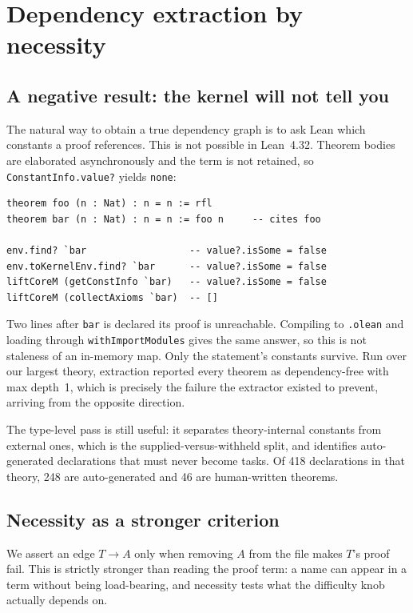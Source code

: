 \documentclass[10pt]{article}
\begin{document}
\section{Dependency extraction by necessity}
\label{sec:extract}

\subsection{A negative result: the kernel will not tell you}

The natural way to obtain a true dependency graph is to ask Lean which constants
a proof references. This is not possible in Lean~4.32. Theorem bodies are
elaborated asynchronously and the term is not retained, so
\texttt{ConstantInfo.value?} yields \texttt{none}:

\begin{lstlisting}
theorem foo (n : Nat) : n = n := rfl
theorem bar (n : Nat) : n = n := foo n     -- cites foo

env.find? `bar                  -- value?.isSome = false
env.toKernelEnv.find? `bar      -- value?.isSome = false
liftCoreM (getConstInfo `bar)   -- value?.isSome = false
liftCoreM (collectAxioms `bar)  -- []
\end{lstlisting}

Two lines after \texttt{bar} is declared its proof is unreachable. Compiling to
\texttt{.olean} and loading through \texttt{withImportModules} gives the same
answer, so this is not staleness of an in-memory map. Only the statement's
constants survive. Run over our largest theory, extraction reported every
theorem as dependency-free with max depth~1, which is precisely the failure the
extractor existed to prevent, arriving from the opposite direction.

The type-level pass is still useful: it separates theory-internal constants from
external ones, which is the supplied-versus-withheld split, and identifies
auto-generated declarations that must never become tasks. Of 418 declarations in
that theory, 248 are auto-generated and 46 are human-written theorems.

\subsection{Necessity as a stronger criterion}

We assert an edge $T \to A$ only when removing $A$ from the file makes $T$'s
proof fail. This is strictly stronger than reading the proof term: a name can
appear in a term without being load-bearing, and necessity tests what the
difficulty knob actually depends on.
\end{document}
